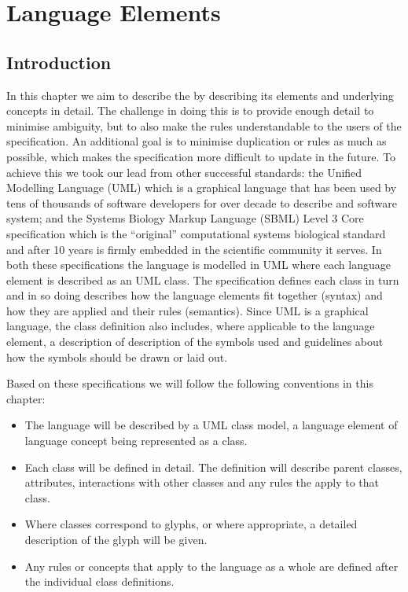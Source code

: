 
\chapter{Language Elements}
\label{chp:glyphs}


\section{Introduction}

In this chapter we aim to describe the \PDl by describing its elements
and underlying concepts in detail. The challenge in doing this is to
provide enough detail to minimise ambiguity, but to also make the
rules understandable to the users of the specification. An additional
goal is to minimise duplication or rules as much as possible, which
makes the specification more difficult to update in the future. To
achieve this we took our lead from other successful standards: the
Unified Modelling Language (UML) \cite{umlspec} which is a graphical
language that has been used by tens of thousands of software
developers for over decade to describe and software system; and the
Systems Biology Markup Language (SBML) Level 3 Core specification
\cite{sbmll3core} which is the ``original'' computational systems
biological standard and after 10 years is firmly embedded in the
scientific community it serves. In both these specifications the
language is modelled in UML where each language element is described
as an UML class. The specification defines each class in turn and in
so doing describes how the language elements fit together (syntax) and
how they are applied and their rules (semantics).  Since UML is a
graphical language, the class definition also includes, where
applicable to the language element, a description of description of
the symbols used and guidelines about how the symbols should be drawn
or laid out.

Based on these specifications we will follow the following conventions
in this chapter:

\begin{itemize}
\item The language will be described by a UML class model, a language
  element of language concept being represented as a class.
\item Each class will be defined in detail. The definition will
  describe parent classes, attributes, interactions with other classes and any rules
  the apply to that class.
\item Where classes correspond to glyphs, or where appropriate, a
detailed description of the glyph will be given.
\item Any rules or concepts that apply to the language as a whole are
  defined after the individual class definitions.
\end{itemize}

